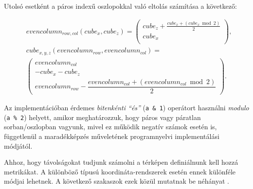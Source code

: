 %

Utolsó esetként a páros indexű oszlopokkal való eltolás számítása a következő:

\begin{align*}
&evencolumn_{row, col}(cube_{x}, cube_{z}) =
\left(
\begin{array}{c}
cube_{z} + \frac{cube_{x} + (cube_{x} \bmod 2)}{2} \\
cube_{x} \\
\end{array}
\right),
\\
&cube_{x,y,z}(evencolumn_{row}, evencolumn_{col}) = \\
&\left(
\begin{array}{c}
evencolumn_{col} \\
-cube_{x} - cube_{z} \\
evencolumn_{row} - \dfrac{evencolumn_{col} + (evencolumn_{col} \bmod 2)}{2}
\end{array}
\right).
\end{align*}

%

Az implementációban érdemes \textit{bitenkénti “és”} (\texttt{a \& 1}) operátort használni \textit{modulo} (\texttt{a \% 2}) helyett, amikor meghatározzuk, hogy páros vagy páratlan sorban/oszlopban vagyunk, mivel ez működik negatív számok esetén is, függetlenül a maradékképzés műveletének programnyelvi implementálási módjától.

\newpage
{}
\label{sec:tavolsag}

Ahhoz, hogy távolságokat tudjunk számolni a térképen definiálnunk kell hozzá metrikákat. A különböző típusú koordináta-rendszerek esetén ennek különféle módjai lehetnek. A következő szakaszok ezek közül mutatnak be néhányat \cite{Distance}.

